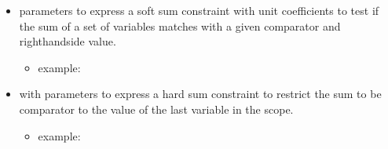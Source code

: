 \documentclass[letterpaper,10pt,openany,oneside,english]{sphinxmanual}
\begin{document}
\begin{itemize}
\begin{itemize}
\begin{sphinxVerbatim}[commandchars=\\\{\}]
  \PYG{p}{[}   \PYG{p}{]}
        
        
           
            
           
\end{sphinxVerbatim}

\end{itemize}

\item {} 
\sphinxAtStartPar
{} parameters  to express a soft sum constraint with unit coefficients to test if the sum of a set of variables matches with a given comparator and right\sphinxhyphen{}hand\sphinxhyphen{}side value.
\begin{itemize}
\item {} 
\sphinxAtStartPar
example:

\begin{sphinxVerbatim}[commandchars=\\\{\}]
  \PYG{p}{[}   \PYG{p}{]}
        
        
           
           
           
           
\end{sphinxVerbatim}

\end{itemize}

\item {} 
\sphinxAtStartPar
{} with parameters  to express a hard sum constraint to restrict the sum to be comparator to the value of the last variable in the scope.
\begin{itemize}
\item {} 
\sphinxAtStartPar
example:


\end{itemize}
\end{itemize}
\end{document}
